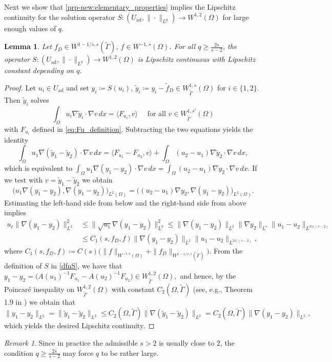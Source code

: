 \documentclass[11pt]{article}
\newcommand{\feas}{U_{\textrm{ad}}}
\newtheorem{lemma}[theorem]{Lemma}
\theoremstyle{definition}
\theoremstyle{remark}
\newtheorem{remark}[theorem]{Remark}
\begin{document}
Next we show that \cref{prp-new:elementary_properties} implies the Lipschitz 
continuity for the solution operator 
$S : (\feas, \|\cdot\|_{L^{q}}) \to W^{1,2}(\Omega)$ for large enough values of $q$.
%
\begin{lemma}\label{lem:S_Lipschitz}
Let $f_D\in W^{1-1/s,s}(\tilde\Gamma)$,
$f \in W^{-1,s}(\Omega)$.
For all $q \ge \frac{2s}{s-2}$, the operator
$
S : (\feas,\|\cdot\|_{L^{q}}) \to W^{1,2}(\Omega)
$
is Lipschitz continuous with Lipschitz constant depending on $q$.
\end{lemma}
\begin{proof}
Let $u_i \in\feas$ and set $y_i \coloneqq S(u_i)$,
$\tilde y_i \coloneqq y_i-\tilde f_D \in W^{1,s}_{\tilde\Gamma}(\Omega)$ for $i \in \{1,2\}$. Then $\tilde y_i$ solves
%
\[
\int_\Omega u_i \nabla \tilde y_i\cdot \nabla v\,dx = \langle F_{u_i}, v\rangle
\quad\text{ for all } v\in W^{1,s'}_{\tilde\Gamma}(\Omega)
\]
%
with $F_{u_i}$ defined in \eqref{eq:Fu_definition}. Subtracting the two equations yields the identity
\[
\int_\Omega u_1 \nabla(\tilde y_1-\tilde y_2)\cdot\nabla v\,dx
=
\langle F_{u_1}-F_{u_2}, v\rangle
+
\int_\Omega (u_2-u_1)\nabla \tilde y_2\cdot\nabla v\,dx ,
\]
which is equivalent to 
$
\int_\Omega u_1 \nabla(y_1-y_2)\cdot\nabla v\,dx
=
\int_\Omega (u_2-u_1)\nabla y_2\cdot\nabla v\,dx.
$
If we test with $v = \tilde{y}_1 - \tilde{y}_2$ we obtain
%
\[
\bigl(u_1 \nabla (y_1- y_2), \nabla(y_1-y_2)\bigr)_{L^2(\Omega)}
= 
\bigl((u_2-u_1)\nabla y_2,\nabla(y_1-y_2)\bigr)_{L^2(\Omega)}.
\]
%
Estimating the left-hand side from below and the right-hand side
from above implies
%
\begin{align*}
u_\ell\|\nabla(y_1 - y_2)\|_{L^2}^2
&\le \|\sqrt{u_1}\nabla(y_1 - y_2)\|_{L^2}^2 \le \|\nabla(y_1 - y_2)\|_{L^2} \|\nabla y_2\|_{L^s} \|u_1 - u_2\|_{L^{2s/(s-2)}} \\
&\le C_1(s,f_D,f)\|\nabla(y_1 - y_2)\|_{L^2} \|u_1 - u_2\|_{L^{2s/(s-2)}},
\end{align*}
%
where
$
C_1(s,f_D,f) \coloneqq
C(s)\bigl(\|f\|_{W^{-1,s}(\Omega)} + \|f_D\|_{W^{1-1/s,s}(\tilde\Gamma)}\bigr)$. 
From the definition of $S$ in \eqref{dfnS}, we have that $y_1 - y_2 =
\bigl(A(u_1)^{-1}F_{u_1}-A(u_2)^{-1}F_{u_2}\bigr)
\in W^{1,2}_{\tilde\Gamma}(\Omega),$ 
and hence, by the Poincar\'e inequality on $W^{1,2}_{\tilde\Gamma}(\Omega)$
with constant $C_2(\Omega,\tilde\Gamma)$ (see, e.g., Theorem 1.9 in \cite{necas2011direct}) we obtain that
\[
\|y_1 - y_2\|_{L^2}
=
\|\tilde{y}_1 - \tilde{y}_2\|_{L^2}
\le
C_2(\Omega,\tilde\Gamma)\|\nabla(\tilde{y}_1-\tilde{y}_2)\|_{L^2}
= C_2(\Omega,\tilde\Gamma)\|\nabla(y_1-y_2)\|_{L^2},
\]
%
which yields the desired Lipschitz continuity.
\end{proof}
%
\begin{remark}
Since in practice the admissible $s>2$ is usually close to $2$,
the condition $q\ge\frac{2s}{s-2}$ may force $q$ to be rather large.
\end{remark}
\end{document}
